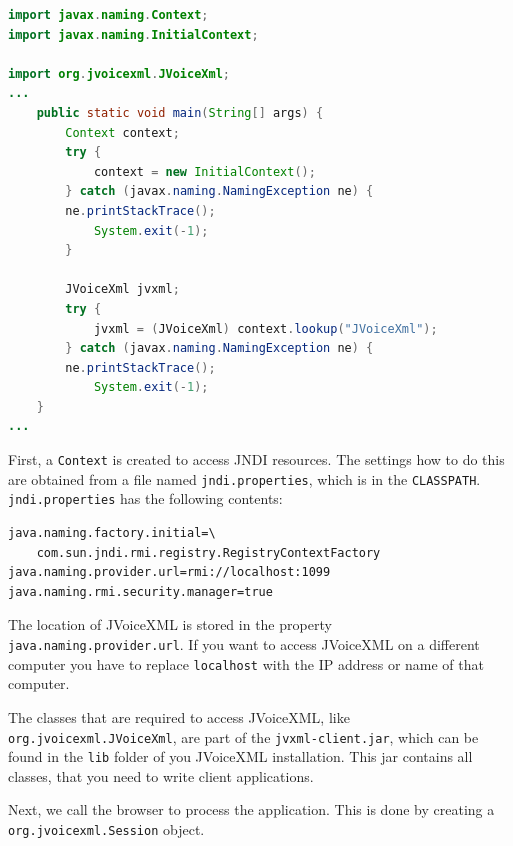 \documentclass[11pt,a4paper]{article}
\begin{document}
\begin{lstlisting}[language=Java]
import javax.naming.Context;
import javax.naming.InitialContext;

import org.jvoicexml.JVoiceXml;
...
    public static void main(String[] args) {
        Context context;
        try {
            context = new InitialContext();
        } catch (javax.naming.NamingException ne) {
	    ne.printStackTrace();
            System.exit(-1);
        }

        JVoiceXml jvxml;
        try {
            jvxml = (JVoiceXml) context.lookup("JVoiceXml");
        } catch (javax.naming.NamingException ne) {
	    ne.printStackTrace();
            System.exit(-1);
    }
...
\end{lstlisting}

First, a \texttt{Context} is created to access JNDI resources.
The settings how to do this are obtained from a file named
\texttt{jndi.properties}, which is in the \texttt{CLASSPATH}.
\texttt{jndi.properties} has the following contents:

\begin{lstlisting}
java.naming.factory.initial=\
    com.sun.jndi.rmi.registry.RegistryContextFactory
java.naming.provider.url=rmi://localhost:1099
java.naming.rmi.security.manager=true
\end{lstlisting}

The location of JVoiceXML is stored in the property 
\texttt{java.naming.pro\-vider.url}. If you want to access JVoiceXML on a 
different computer you have to replace \texttt{localhost} with the IP address 
or name of that computer.

The classes  that are required to access JVoiceXML, like 
\texttt{org.jvoicexml.JVoiceXml}, are part of the
\texttt{jvxml-client.jar}, which can be found in the \texttt{lib}
folder of you JVoiceXML installation. This jar contains all classes, that you 
need to write client applications.

Next, we call the browser to process the application. This is done by creating 
a \texttt{org.jvoicexml.Session} object.
\end{document}
